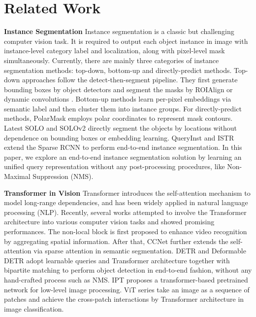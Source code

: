 \documentclass{article}
\begin{document}
\section{Related Work}
\textbf{Instance Segmentation}
Instance segmentation is a classic but challenging computer vision task. It is required to output each object instance in image with instance-level category label and localization, along with pixel-level mask simultaneously. Currently, there are mainly three categories of instance segmentation methods: top-down, bottom-up and directly-predict methods. Top-down approaches \cite{li2017fcis,he2017maskrcnn,bolya2019yolact,zhang2020meinst,chen2020blendmask,chen2019tensormask,huang2019maskscoringrcnn,liu2018panet,queryinst2021} follow the detect-then-segment pipeline. They first generate bounding boxes by object detectors and segment the masks by ROIAlign \cite{he2017maskrcnn} or dynamic convolutions \cite{tian2020conditional}. Bottom-up methods \cite{gao2019ssap,liu2017sgn,de2017semantic,newell2016associativeembedding} learn per-pixel embeddings via semantic label and then cluster them into instance groups. For directly-predict methods, PolarMask \cite{xie2020polarmask} employs polar coordinates to represent mask contours. Latest SOLO \cite{wang2020solo} and SOLOv2 \cite{wang2020solov2} directly segment the objects by locations without dependence on bounding boxes or embedding learning. QueryInst \cite{queryinst2021} and ISTR \cite{hu2021istr} extend the Sparse RCNN \cite{sun2021sparsercnn} to perform end-to-end instance segmentation. In this paper, we explore an end-to-end instance segmentation solution by learning an unified query representation without any post-processing procedures, like Non-Maximal Suppression (NMS). 

\textbf{Transformer in Vision}
Transformer \cite{vaswani2017attention} introduces the self-attention mechanism to model long-range dependencies, and has been widely applied in natural language processing (NLP). Recently, several works attempted to involve the Transformer architecture into various computer vision tasks and showed promising performances. The non-local block \cite{wang2018nonlocal} is first proposed to enhance video recognition by aggregating spatial information. After that, CCNet \cite{huang2019ccnet} further extends the self-attention via sparse attention in semantic segmentation. DETR \cite{carion2020detr} and Deformable DETR \cite{zhu2020deformabledetr} adopt learnable queries and Transformer architecture together with bipartite matching to perform object detection in end-to-end fashion, without any hand-crafted process such as NMS. IPT \cite{chen2020ipt} proposes a transformer-based pretrained network for low-level image processing. ViT series \cite{dosovitskiy2020vit,touvron2020deit,wang2021pvt,liu2021swin} take an image as a sequence of patches and achieve the cross-patch interactions by Transformer architecture in image classification. 
\end{document}

